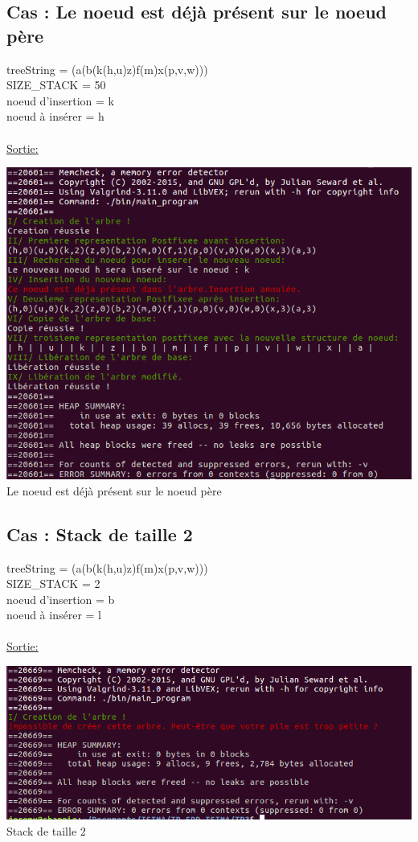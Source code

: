 \documentclass[a4paper]{article}
\begin{document}
\subsection{Cas : Le noeud est déjà présent sur le noeud père}
treeString = (a(b(k(h,u)z)f(m)x(p,v,w)))
\\ 
SIZE\_STACK = 50
\\
noeud d'insertion = k
\\
noeud à insérer = h
\\
\\
\underline{Sortie: }
\begin{center}
\includegraphics[scale=0.6]{noeud_present.png}
\\
Le noeud est déjà présent sur le noeud père
\end{center}

\subsection{Cas : Stack de taille 2}
treeString = (a(b(k(h,u)z)f(m)x(p,v,w)))
\\ 
SIZE\_STACK = 2
\\
noeud d'insertion = b
\\
noeud à insérer = l
\\
\\
\underline{Sortie: }
\begin{center}
\includegraphics[scale=0.6]{stack_2.png}
\\
Stack de taille 2
\end{center}
\end{document}
